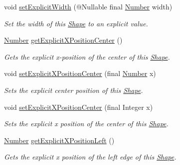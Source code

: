 \begin{DoxyCompactItemize}
void \hyperlink{classcom_1_1aarrelaakso_1_1drawl_1_1_shape_a386685477bfc007aab782565f140265d}{set\+Explicit\+Width} (@Nullable final \hyperlink{interfacecom_1_1aarrelaakso_1_1drawl_1_1_number}{Number} width)
\begin{DoxyCompactList}\small\item\em Set the width of this \hyperlink{classcom_1_1aarrelaakso_1_1drawl_1_1_shape}{Shape} to an explicit value. \end{DoxyCompactList}\item 
\hyperlink{interfacecom_1_1aarrelaakso_1_1drawl_1_1_number}{Number} \hyperlink{classcom_1_1aarrelaakso_1_1drawl_1_1_shape_aa1fbd5a290bc5d2df437f0bd79f30a89}{get\+Explicit\+X\+Position\+Center} ()
\begin{DoxyCompactList}\small\item\em Gets the explicit x-\/position of the center of this \hyperlink{classcom_1_1aarrelaakso_1_1drawl_1_1_shape}{Shape}. \end{DoxyCompactList}\item 
void \hyperlink{classcom_1_1aarrelaakso_1_1drawl_1_1_shape_a28c766b414be0cd8767093f9be557dbd}{set\+Explicit\+X\+Position\+Center} (final \hyperlink{interfacecom_1_1aarrelaakso_1_1drawl_1_1_number}{Number} x)
\begin{DoxyCompactList}\small\item\em Sets the explicit center position of this \hyperlink{classcom_1_1aarrelaakso_1_1drawl_1_1_shape}{Shape}. \end{DoxyCompactList}\item 
void \hyperlink{classcom_1_1aarrelaakso_1_1drawl_1_1_shape_a271cd9377952616a30a434b22e22000a}{set\+Explicit\+X\+Position\+Center} (final Integer x)
\begin{DoxyCompactList}\small\item\em Sets the explicit x position of the center of this \hyperlink{classcom_1_1aarrelaakso_1_1drawl_1_1_shape}{Shape}. \end{DoxyCompactList}\item 
\hyperlink{interfacecom_1_1aarrelaakso_1_1drawl_1_1_number}{Number} \hyperlink{classcom_1_1aarrelaakso_1_1drawl_1_1_shape_abd7f6c77e2c62100bb72d8ad3085e288}{get\+Explicit\+X\+Position\+Left} ()
\begin{DoxyCompactList}\small\item\em Gets the explicit x position of the left edge of this \hyperlink{classcom_1_1aarrelaakso_1_1drawl_1_1_shape}{Shape}. \end{DoxyCompactList}\item 

\end{DoxyCompactItemize}
